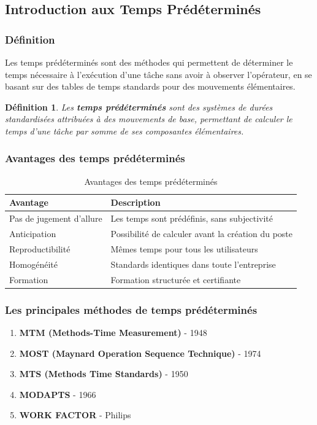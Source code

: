 \documentclass[a4paper,12pt]{article}
\newtheorem{definition}{Définition}[section]
\begin{document}
\subsection{Introduction aux Temps Prédéterminés}

\subsubsection{Définition}

Les temps prédéterminés sont des méthodes qui permettent de déterminer le temps nécessaire à l'exécution d'une tâche sans avoir à observer l'opérateur, en se basant sur des tables de temps standards pour des mouvements élémentaires.

\begin{definition}
Les \textbf{temps prédéterminés} sont des systèmes de durées standardisées attribuées à des mouvements de base, permettant de calculer le temps d'une tâche par somme de ses composantes élémentaires.
\end{definition}

\subsubsection{Avantages des temps prédéterminés}

\begin{table}[ht]
\centering
\begin{tabular}{|p{5cm}|p{9cm}|}
\hline
\textbf{Avantage} & \textbf{Description} \\
\hline
Pas de jugement d'allure & Les temps sont prédéfinis, sans subjectivité \\
Anticipation & Possibilité de calculer avant la création du poste \\
Reproductibilité & Mêmes temps pour tous les utilisateurs \\
Homogénéité & Standards identiques dans toute l'entreprise \\
Formation & Formation structurée et certifiante \\
\hline
\end{tabular}
\caption{Avantages des temps prédéterminés}
\end{table}

\subsubsection{Les principales méthodes de temps prédéterminés}

\begin{enumerate}
    \item \textbf{MTM (Methods-Time Measurement)} - 1948
    \item \textbf{MOST (Maynard Operation Sequence Technique)} - 1974
    \item \textbf{MTS (Methods Time Standards)} - 1950
    \item \textbf{MODAPTS} - 1966
    \item \textbf{WORK FACTOR} - Philips
\end{enumerate}
\end{document}

